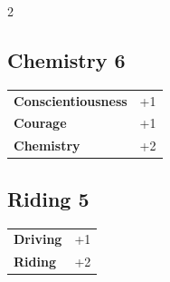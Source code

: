 \begin{multicols}{2}
\begin{tcolorbox}

\end{tcolorbox}

\begin{tcolorbox}
    \subsection*{Chemistry \hfill \small{6 }}
    \tcblower




\begin{tabular}{@{}ll@{}}
    \textbf{Conscientiousness} & +1\\
    \textbf{Courage} & +1\\
    \textbf{Chemistry} & +2\\
\end{tabular}


\end{tcolorbox}

\begin{tcolorbox}
    \subsection*{Riding \hfill \small{5 }}
    \tcblower




\begin{tabular}{@{}ll@{}}
    \textbf{Driving} & +1\\
    \textbf{Riding} & +2\\
\end{tabular}


\end{tcolorbox}


\end{multicols}

